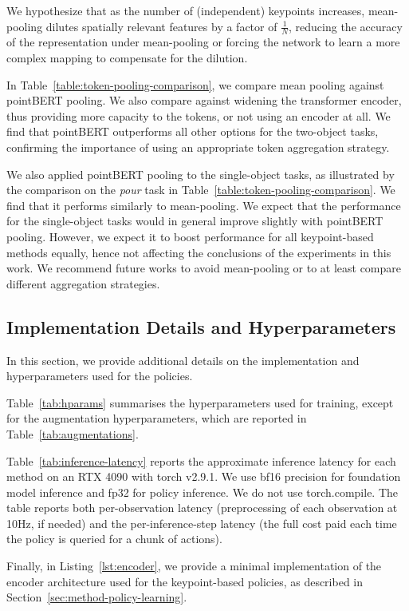 \documentclass[letterpaper, 10 pt, conference]{ieeeconf}  %
\begin{document}
We hypothesize that as the number of (independent) keypoints increases, mean-pooling dilutes spatially relevant features by a factor of 
\(\frac{1}{N}\), reducing the accuracy of the representation under mean-pooling or forcing the network to learn a more complex mapping to compensate for the dilution.

In Table~\ref{table:token-pooling-comparison}, we compare mean pooling against pointBERT pooling. We also compare against widening the transformer encoder, thus providing more capacity to the tokens, or not using an encoder at all. We find that pointBERT  outperforms all other options for the two-object tasks, confirming the importance of using an appropriate token aggregation strategy.

We also applied pointBERT pooling to the single-object tasks, as illustrated by the comparison on the \textit{pour} task in Table~\ref{table:token-pooling-comparison}. We find that it performs similarly to mean-pooling.
We expect that the performance for the single-object tasks would in general improve slightly with pointBERT pooling. However, we expect it to boost performance for all keypoint-based methods equally, hence not affecting the conclusions of the experiments in this work. We recommend future works to avoid mean-pooling or to at least compare different aggregation strategies.


\subsection{Implementation Details and Hyperparameters}
\label{sec:appendix-implementation-details-and-hyperparameters}
In this section, we provide additional details on the implementation and hyperparameters used for the policies.


Table~\ref{tab:hparams} summarises the hyperparameters used for training, except for the augmentation hyperparameters, which are reported in Table~\ref{tab:augmentations}. 

Table~\ref{tab:inference-latency} reports the approximate inference latency for each method on an RTX 4090 with torch v2.9.1. We use bf16 precision for foundation model inference and fp32 for policy inference. We do not use torch.compile. The table reports both per-observation latency (preprocessing of each observation at 10Hz, if needed) and the per-inference-step latency (the full cost paid each time the policy is queried for a chunk of actions).

Finally, in Listing~\ref{lst:encoder}, we provide a minimal implementation of the encoder architecture used for the keypoint-based policies, as described in Section~\ref{sec:method-policy-learning}.
\end{document}
